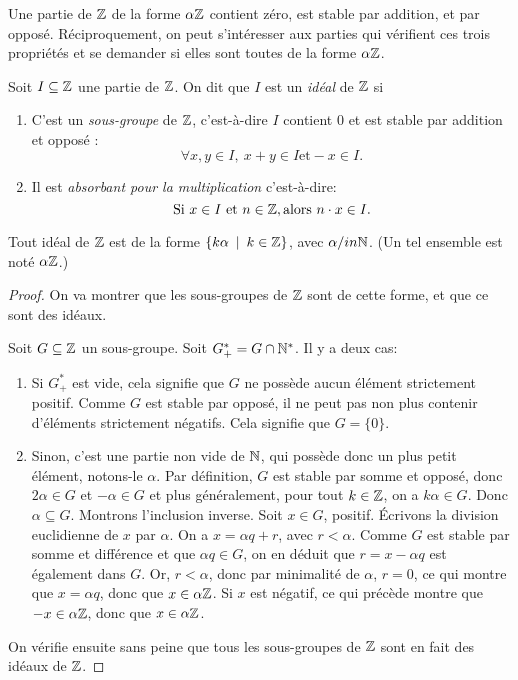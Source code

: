 Une partie de $\mathbb{Z}$ de la forme $\alpha\mathbb{Z}$ contient zéro, est stable par addition, et par opposé. Réciproquement, on peut s'intéresser aux parties qui vérifient ces trois  propriétés et se demander si elles sont toutes de la forme $\alpha\mathbb{Z}$.

\begin{definition}
Soit $I \subseteq \mathbb{Z}$ une partie de $\mathbb{Z}$. On dit que $I$ est un \emph{idéal} de $\mathbb{Z}$ si
\begin{enumerate}
\item C'est un \emph{sous-groupe} de $\mathbb{Z}$, c'est-à-dire $I$ contient $0$ et est stable par addition et opposé : 
\[ \forall x, y\in I, \: x+y \in I \text{et} -x \in I.\]
\item Il est \emph{absorbant pour la multiplication} c'est-à-dire:
\[  \text{Si } x \in I \text{ et }n\in \mathbb{Z}, \text{alors } n\cdot x \in I.\]
\end{enumerate}
\end{definition}

\begin{proposition}
Tout idéal de $\mathbb{Z}$ est de la forme $\{k\alpha\:\mid \: k \in \mathbb{Z}\}$, avec $\alpha /in \mathbb{N}$. (Un tel ensemble est noté $\alpha\mathbb{Z}$.)
\end{proposition}

\begin{proof}
On va montrer que les sous-groupes de $\mathbb{Z}$ sont de cette forme, et que ce sont des idéaux.

Soit $G \subseteq \mathbb{Z}$ un sous-groupe. Soit $G^*_+ = G \cap \mathbb{N}^*$. Il y a deux cas:
\begin{enumerate}
\item Si $G^*_+$ est vide, cela signifie que $G$ ne possède aucun élément strictement positif. Comme $G$ est stable par opposé, il ne peut pas non plus contenir d'éléments strictement négatifs. Cela signifie que $G=\{0\}$.
\item Sinon, c'est une partie non vide de $\mathbb{N}$, qui possède donc un plus petit élément, notons-le $\alpha$.
Par définition, $G$ est stable par somme et opposé, donc $2\alpha\in G$ et $-\alpha \in G$ et plus généralement, pour tout $k\in \mathbb{Z}$, on a $k\alpha \in G$.
Donc $\alpha \subseteq G$. Montrons l'inclusion inverse.
Soit $x\in G$, positif. \'Ecrivons la division euclidienne de $x$ par $\alpha$. On a $x = \alpha q + r$, avec $r<\alpha$. Comme $G$ est stable par somme et différence et que $\alpha q \in G$, on en déduit que $r = x-\alpha q$ est également dans $G$. Or, $r<\alpha$, donc par minimalité de $\alpha$, $r=0$, ce qui montre que $x = \alpha q$, donc que $x\in \alpha\mathbb{Z}$.
Si $x$ est négatif, ce qui précède montre que $-x\in \alpha\mathbb{Z}$, donc que $x\in \alpha\mathbb{Z}$.
\end{enumerate}

On vérifie ensuite sans peine que tous les sous-groupes de $\mathbb{Z}$ sont en fait des idéaux de $\mathbb{Z}$.
\end{proof}


